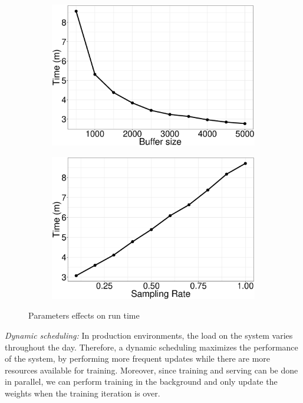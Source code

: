 \documentclass{vldb}
\begin{document}
\begin{figure}[H]
\begin{subfigure}{0.5\columnwidth}
\includegraphics[width=\columnwidth]{../images/experiment-results/movie-lens-100k-buffer-time-improved.eps}
\caption{}
\label{fig:movie-lens-100k-buffer-size-time}
\end{subfigure}%
\begin{subfigure}{0.5\columnwidth}
\includegraphics[width=\columnwidth]{../images/experiment-results/movie-lens-100k-sampling-time-improved.eps}
\caption{}
\label{fig:movie-lens-100k-sample-rate-time}
\end{subfigure}
\vspace{2mm}
\caption{Parameters effects on run time}
\end{figure}

\textit{Dynamic scheduling:} In production environments, the load on the system varies throughout the day. 
Therefore, a dynamic scheduling maximizes the performance of the system, by performing more frequent updates while there are more resources available for training. 
Moreover, since training and serving can be done in parallel, we can perform training in the background and only update the weights when the training iteration is over. 
\end{document}
